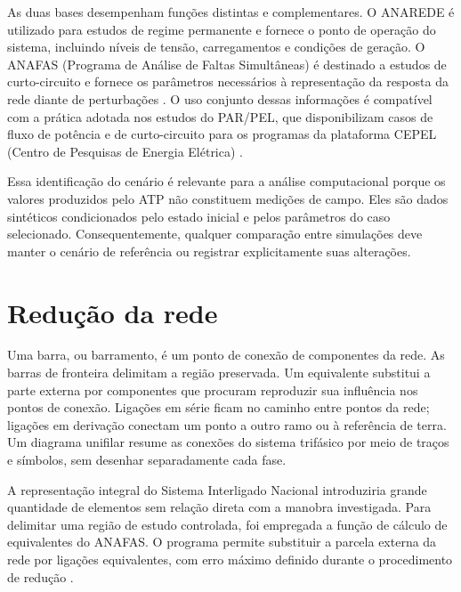 \documentclass[
	12pt,				%
	openright,			%
	oneside,			%
	a4paper,			%
	chapter=TITLE,		%
	section=TITLE,		%
	subsection=TITLE,	%
	subsubsection=TITLE,%
	english,			%
	brazilian			%
	]{abntex2}
\theoremstyle{definition}
\begin{document}
As duas bases desempenham funções distintas e complementares. O ANAREDE é
utilizado para estudos de regime permanente e fornece o ponto de operação do
sistema, incluindo níveis de tensão, carregamentos e condições de geração. O
ANAFAS (Programa de Análise de Faltas Simultâneas) é destinado a estudos de curto-circuito e fornece os parâmetros
necessários à representação da resposta da rede diante de perturbações
\cite{cepelAnarede2026,cepelAnafas2026}. O uso conjunto dessas informações é
compatível com a prática adotada nos estudos do PAR/PEL, que disponibilizam
casos de fluxo de potência e de curto-circuito para os programas da plataforma
CEPEL (Centro de Pesquisas de Energia Elétrica) \cite{ons2026pnast}.

Essa identificação do cenário é relevante para a análise computacional porque
os valores produzidos pelo ATP não constituem medições de campo. Eles são
dados sintéticos condicionados pelo estado inicial e pelos parâmetros do caso
selecionado. Consequentemente, qualquer comparação entre simulações deve manter
o cenário de referência ou registrar explicitamente suas alterações.

\section{Redução da rede}

Uma barra, ou barramento, é um ponto de conexão de componentes da rede.
As barras de fronteira delimitam a região preservada. Um equivalente
substitui a parte externa por componentes que procuram reproduzir sua
influência nos pontos de conexão. Ligações em série ficam no caminho
entre pontos da rede; ligações em derivação conectam um ponto a outro
ramo ou à referência de terra. Um diagrama unifilar resume as conexões
do sistema trifásico por meio de traços e símbolos, sem desenhar
separadamente cada fase.

A representação integral do Sistema Interligado Nacional introduziria grande
quantidade de elementos sem relação direta com a manobra investigada. Para
delimitar uma região de estudo controlada, foi empregada a função de cálculo de
equivalentes do ANAFAS. O programa permite substituir a parcela externa da rede
por ligações equivalentes, com erro máximo definido durante o procedimento de
redução \cite{cepelAnafas2026}.
\end{document}
